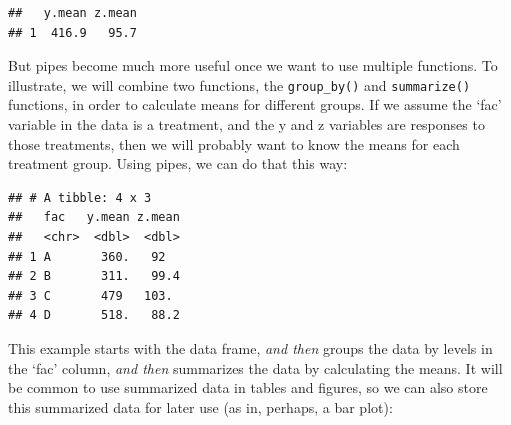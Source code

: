 \documentclass[letterpaper,]{book}
\newenvironment{Shaded}{\begin{snugshade}}{\end{snugshade}}
\newcommand{\CommentTok}[1]{\textcolor[rgb]{0.56,0.35,0.01}{\textit{#1}}}
\newcommand{\DataTypeTok}[1]{\textcolor[rgb]{0.13,0.29,0.53}{#1}}
\newcommand{\KeywordTok}[1]{\textcolor[rgb]{0.13,0.29,0.53}{\textbf{#1}}}
\newcommand{\NormalTok}[1]{#1}
\newcommand{\OperatorTok}[1]{\textcolor[rgb]{0.81,0.36,0.00}{\textbf{#1}}}
\newcommand{\StringTok}[1]{\textcolor[rgb]{0.31,0.60,0.02}{#1}}
\begin{document}
\begin{verbatim}
##   y.mean z.mean
## 1  416.9   95.7
\end{verbatim}

But pipes become much more useful once we want to use multiple functions. To illustrate, we will combine two functions, the \texttt{group\_by()} and \texttt{summarize()} functions, in order to calculate means for different groups. If we assume the `fac' variable in the data is a treatment, and the y and z variables are responses to those treatments, then we will probably want to know the means for each treatment group. Using pipes, we can do that this way:

\begin{Shaded}
\end{Shaded}

\begin{verbatim}
## # A tibble: 4 x 3
##   fac   y.mean z.mean
##   <chr>  <dbl>  <dbl>
## 1 A       360.   92  
## 2 B       311.   99.4
## 3 C       479   103. 
## 4 D       518.   88.2
\end{verbatim}

This example starts with the data frame, \emph{and then} groups the data by levels in the `fac' column, \emph{and then} summarizes the data by calculating the means. It will be common to use summarized data in tables and figures, so we can also store this summarized data for later use (as in, perhaps, a bar plot):

\begin{Shaded}
\end{Shaded}
\end{document}

